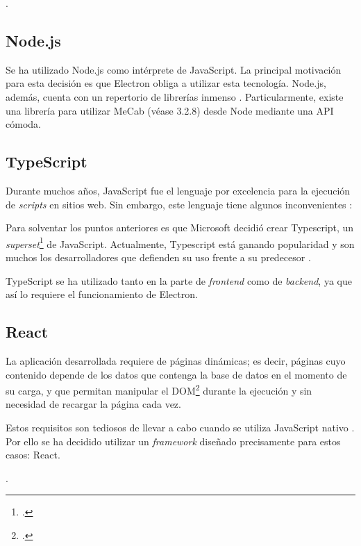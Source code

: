 .

\subsection{Node.js}

Se ha utilizado Node.js como intérprete de JavaScript. La principal motivación para esta decisión es que Electron obliga a utilizar esta tecnología. Node.js, además, cuenta con un repertorio de librerías inmenso \todo. Particularmente, existe una librería para utilizar MeCab (véase 3.2.8) desde Node mediante una API cómoda.

\subsection{TypeScript}

Durante muchos años, JavaScript fue el lenguaje por excelencia para la ejecución de \textit{scripts} en sitios web. Sin embargo, este lenguaje tiene algunos inconvenientes \autocite{10.1007/978-3-662-44202-9_11}: \todo

Para solventar los puntos anteriores es que Microsoft decidió crear Typescript, un \textit{superset}\footnote{.} de JavaScript. Actualmente, Typescript está ganando popularidad y son muchos los desarrolladores que defienden su uso frente a su predecesor \autocite{Typescript}.

TypeScript se ha utilizado tanto en la parte de \textit{frontend} como de \textit{backend}, ya que así lo requiere el funcionamiento de Electron.

\subsection{React}

La aplicación desarrollada requiere de páginas dinámicas; es decir, páginas cuyo contenido depende de los datos que contenga la base de datos en el momento de su carga, y que permitan manipular el DOM\footnote{.} durante la ejecución y sin necesidad de recargar la página cada vez.

Estos requisitos son tediosos de llevar a cabo cuando se utiliza JavaScript nativo \citationNeeded. Por ello se ha decidido utilizar un \textit{framework} diseñado precisamente para estos casos: React.

.

